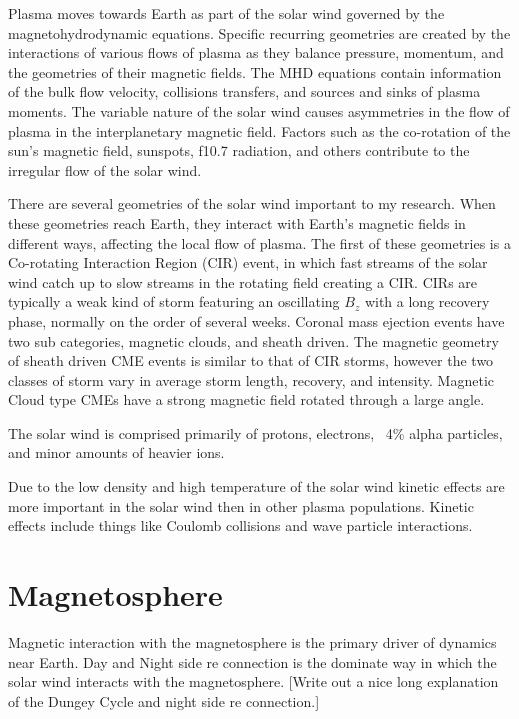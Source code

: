 \documentclass[utf8]{report}
\newcommand{\mhd}[1][0]{magnetohydrodynamic }
\begin{document}
Plasma moves towards Earth as part of the solar wind governed by the \mhd equations. Specific recurring geometries are created by the interactions of various flows of plasma as they balance pressure, momentum, and the geometries of their magnetic fields. The MHD equations contain information of the bulk flow velocity, collisions transfers, and sources and sinks of plasma moments. 
The variable nature of the solar wind causes asymmetries in the flow of plasma in the interplanetary magnetic field. Factors such as the co-rotation of the sun's magnetic field, sunspots, f10.7 radiation, and others contribute to the irregular flow of the solar wind.

There are several geometries of the solar wind important to my research. When these geometries reach Earth, they interact with Earth's magnetic fields in different ways, affecting the local flow of plasma. The first of these geometries is a Co-rotating Interaction Region (CIR) event, in which fast streams of the solar wind catch up to slow streams in the rotating field creating a CIR. CIRs are typically a weak kind of storm featuring an oscillating $B_{z}$ with a long recovery phase, normally on the order of several weeks. Coronal mass ejection events have two sub categories, magnetic clouds, and sheath driven. The magnetic geometry of sheath driven CME events is similar to that of CIR storms, however the two classes of storm vary in average storm length, recovery, and intensity. Magnetic Cloud type CMEs have a strong magnetic field rotated through a large angle. %

The solar wind is comprised primarily of protons, electrons, ~4\% alpha particles, and minor amounts of heavier ions. 

Due to the low density and high temperature of the solar wind kinetic effects are more important in the solar wind then in other plasma populations. Kinetic effects include things like Coulomb collisions and wave particle interactions. 

\section{Magnetosphere}

Magnetic interaction with the magnetosphere is the primary driver of dynamics near Earth. Day and Night side re connection is the dominate way in which the solar wind interacts with the magnetosphere. [\color{red}Write out a nice long explanation of the Dungey Cycle and night side re connection.\color{black}]
\end{document}
